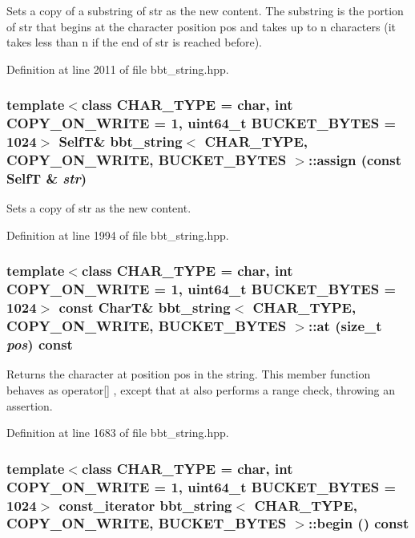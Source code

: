 Sets a copy of a substring of str as the new content. The substring is the portion of str that begins at the character position pos and takes up to n characters (it takes less than n if the end of str is reached before). 

Definition at line 2011 of file bbt\_\-string.hpp.\hypertarget{classbbt__string_a2171144958b01ccef526ec918229697}{
\subsubsection[{assign}]{\setlength{\rightskip}{0pt plus 5cm}template$<$class CHAR\_\-TYPE  = char, int COPY\_\-ON\_\-WRITE = 1, uint64\_\-t BUCKET\_\-BYTES = 1024$>$ {\bf SelfT}\& {\bf bbt\_\-string}$<$ CHAR\_\-TYPE, COPY\_\-ON\_\-WRITE, BUCKET\_\-BYTES $>$::assign (const {\bf SelfT} \& {\em str})}}
\label{classbbt__string_a2171144958b01ccef526ec918229697}


Sets a copy of str as the new content. 

Definition at line 1994 of file bbt\_\-string.hpp.\hypertarget{classbbt__string_96366cce7bcb5045b562135e6bc20444}{
\subsubsection[{at}]{\setlength{\rightskip}{0pt plus 5cm}template$<$class CHAR\_\-TYPE  = char, int COPY\_\-ON\_\-WRITE = 1, uint64\_\-t BUCKET\_\-BYTES = 1024$>$ const CharT\& {\bf bbt\_\-string}$<$ CHAR\_\-TYPE, COPY\_\-ON\_\-WRITE, BUCKET\_\-BYTES $>$::at (size\_\-t {\em pos}) const}}
\label{classbbt__string_96366cce7bcb5045b562135e6bc20444}


Returns the character at position pos in the string. This member function behaves as operator\mbox{[}\mbox{]} , except that at also performs a range check, throwing an assertion. 

Definition at line 1683 of file bbt\_\-string.hpp.\hypertarget{classbbt__string_65dc62558aea86248f43967709e4e012}{
\subsubsection[{begin}]{\setlength{\rightskip}{0pt plus 5cm}template$<$class CHAR\_\-TYPE  = char, int COPY\_\-ON\_\-WRITE = 1, uint64\_\-t BUCKET\_\-BYTES = 1024$>$ const\_\-iterator {\bf bbt\_\-string}$<$ CHAR\_\-TYPE, COPY\_\-ON\_\-WRITE, BUCKET\_\-BYTES $>$::begin () const}}
\label{classbbt__string_65dc62558aea86248f43967709e4e012}


